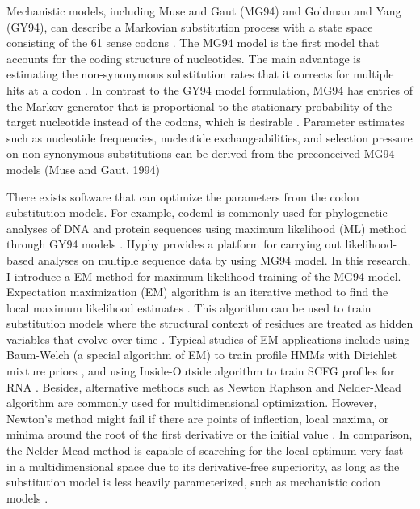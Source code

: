 Mechanistic models, including Muse and Gaut (MG94) and Goldman and Yang (GY94),  can describe a Markovian substitution process with a state space consisting of the 61 sense codons \parencite{suchard2001bayesian}. The MG94 model is the first model that accounts for the coding structure of nucleotides. The main advantage is estimating the non-synonymous substitution rates that it corrects for multiple hits at a codon \parencite{muse1994likelihood}. In contrast to the GY94 model formulation, MG94 has entries of the Markov generator that is proportional to the stationary probability of the target nucleotide instead of the codons, which is desirable \parencite{huelsenbeck2004bayesian}. Parameter estimates such as nucleotide frequencies, nucleotide exchangeabilities, and selection pressure on non-synonymous substitutions can be derived from the preconceived MG94 models (Muse and Gaut, 1994)   

There exists software that can optimize the parameters from the codon substitution models. For example, codeml is commonly used for phylogenetic analyses of DNA and protein sequences using maximum likelihood (ML) method through GY94 models \parencite{yang2007paml}. Hyphy provides a platform for carrying out likelihood-based analyses on multiple sequence data by using MG94 model. In this research, I introduce a EM method for maximum likelihood training of the MG94 model. Expectation maximization (EM) algorithm is an iterative method to find the local maximum likelihood estimates \parencite{dempster1977maximum}. This algorithm can be used to train substitution models where the structural context of residues are treated as hidden variables that evolve over time \parencite{holmes2002expectation}. Typical studies of EM applications include using Baum-Welch (a special algorithm of EM) to train profile HMMs with Dirichlet mixture priors \parencite{brown1993using}, and using Inside-Outside algorithm to train SCFG profiles for RNA \parencite{durbin1998biological}. Besides, alternative methods such as Newton Raphson and Nelder-Mead algorithm are commonly used for multidimensional optimization. However, Newton's method might fail if there are points of inflection, local maxima, or minima around the root of the first derivative or the initial value \parencite{more1982newton}. In comparison, the Nelder-Mead method is capable of searching for the local optimum very fast in a multidimensional space due to its derivative-free superiority, as long as the substitution model is less heavily parameterized, such as mechanistic codon models \parencite{yu1979convergente}.  

